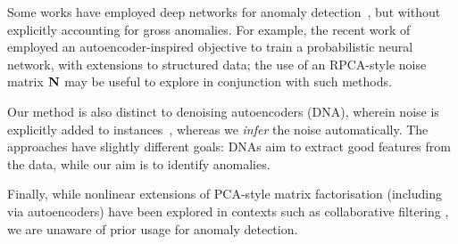 Some works have employed deep networks for anomaly detection~\cite{Williams:2002,Zhai:2016},
but without explicitly accounting for gross anomalies.
For example, the recent work of \cite{Zhai:2016} employed an autoencoder-inspired objective to train a probabilistic neural network, with extensions to structured data;
the use of an RPCA-style noise matrix $\mathbf{N}$ may be useful to explore in conjunction with such methods.

Our method is also distinct to denoising autoencoders (DNA), wherein noise is explicitly added to instances~\cite{vincent2010stacked}, whereas we \emph{infer} the noise automatically.
The approaches have slightly different goals: DNAs aim to extract good features from the data, while our aim is to identify anomalies.

Finally, while nonlinear extensions of PCA-style matrix factorisation (including via autoencoders) have been explored in contexts such as collaborative filtering \cite{Lawrence:2009,Sedhain:2015}, we are unaware of prior usage for anomaly detection.
